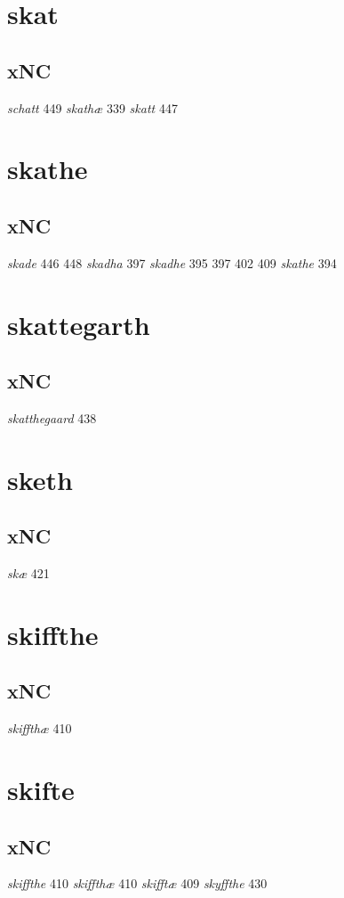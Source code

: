 \documentclass[a4paper,twocolumn]{article}
\begin{document}
\section{skat}
\label{sec:org8cdb4f3}
\subsection{xNC}
\label{sec:org82e6463}
\emph{schatt} 449 \emph{skathæ} 339 \emph{skatt} 447 
\section{skathe}
\label{sec:org7096c33}
\subsection{xNC}
\label{sec:org679d63f}
\emph{skade} 446 448 \emph{skadha} 397 \emph{skadhe} 395 397 402 409 \emph{skathe} 394 
\section{skattegarth}
\label{sec:orgc77a756}
\subsection{xNC}
\label{sec:orgdfd2bb3}
\emph{skatthegaard} 438 
\section{sketh}
\label{sec:org3afd9bc}
\subsection{xNC}
\label{sec:org9404a26}
\emph{skæ} 421 
\section{skiffthe}
\label{sec:orge614a15}
\subsection{xNC}
\label{sec:org0e6cc3a}
\emph{skiffthæ} 410 
\section{skifte}
\label{sec:orgba9d75d}
\subsection{xNC}
\label{sec:org382eaf4}
\emph{skiffthe} 410 \emph{skiffthæ} 410 \emph{skifftæ} 409 \emph{skyffthe} 430 
\end{document}
